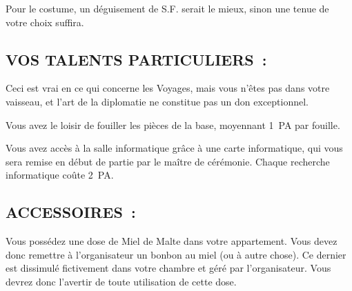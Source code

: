 \documentclass[14pt,twocolumn]{extarticle}
\begin{document}
Pour le costume, un déguisement de S.F. serait le mieux, sinon une tenue de
votre choix suffira.

\subsection{VOS TALENTS PARTICULIERS~:}

Ceci est vrai en ce qui concerne les Voyages, mais vous n'êtes pas dans votre
vaisseau, et l'art de la diplomatie ne constitue pas un don exceptionnel.

Vous avez le loisir de fouiller les pièces de la base, moyennant 1~PA par
fouille.

Vous avez accès à la salle informatique grâce à une carte informatique, qui
vous sera remise en début de partie par le maître de cérémonie. Chaque
recherche informatique coûte 2~PA.

\subsection{ACCESSOIRES~:}

Vous possédez une dose de Miel de Malte dans votre appartement. Vous devez donc
remettre à l'organisateur un bonbon au miel (ou à autre chose). Ce dernier est
dissimulé fictivement dans votre chambre et géré par l'organisateur. Vous
devrez donc l'avertir de toute utilisation de cette dose.
\end{document}
